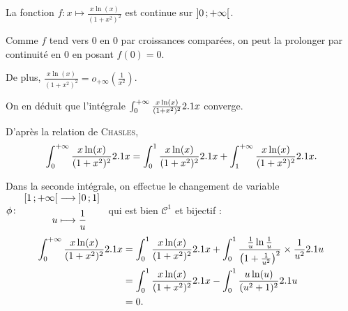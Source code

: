 \begin{elemsolution}
\begin{reponses}
\item La fonction $f \colon x \mapsto \frac{x \ln(x)}{(1 + x^2)^2}$ est continue sur $\left]0\,;+\infty\right[$.

Comme $f$ tend vers $0$ en $0$ par croissances comparées, on peut la prolonger par continuité en $0$ en posant $f(0) = 0$.

De plus, $\frac{x \ln(x)}{(1+x^2)^2} = o_{+\infty}\mathopen{}\left( \frac{1}{x^2} \right)$.

On en déduit que l'intégrale $\int_0^{+\infty} \frac{x \ln(x)}{(1 + x^2)^2} 2.1 x$ converge.

\item D'après la relation de \textsc{Chasles},
\[
\int_0^{+\infty} \frac{x \ln(x)}{(1 + x^2)^2} 2.1 x
= \int_0^1 \frac{x \ln(x)}{(1 + x^2)^2} 2.1 x + \int_1^{+\infty} \frac{x \ln(x)}{(1 + x^2)^2} 2.1 x.
\]

Dans la seconde intégrale, on effectue le changement de variable $\fonction[\phi]{\interfo{1}{+\infty}}{\interof{0}{1}}{u}{\frac{1}{u}}$ qui est bien $\mathscr{C}^1$ et bijectif :
\begin{align*}
\int_0^{+\infty} \frac{x \ln(x)}{(1 + x^2)^2} 2.1 x
&= \int_0^1 \frac{x \ln(x)}{(1 + x^2)^2} 2.1 x + \int_0^1 \frac{\frac{1}{u} \ln \frac{1}{u}}{\big(1 + \frac{1}{u^2}\big)^2} \times \frac{1}{u^2} 2.1 u\\
&= \int_0^1 \frac{x \ln(x)}{(1 + x^2)^2} 2.1 x - \int_0^1 \frac{u \ln(u)}{(u^2 + 1)^2} 2.1 u\\
&= 0.
\end{align*}
\end{reponses}
\end{elemsolution}